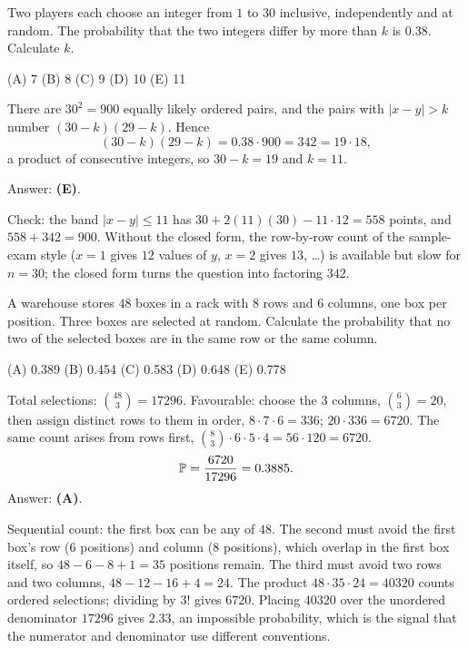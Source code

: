 \begin{example}
Two players each choose an integer from $1$ to $30$ inclusive, independently and at random.
The probability that the two integers differ by more than $k$ is $0.38$. Calculate $k$.
\par\smallskip\noindent (A) 7 \quad (B) 8 \quad (C) 9 \quad (D) 10 \quad (E) 11
\end{example}
\begin{solution}
There are $30^2 = 900$ equally likely ordered pairs, and the pairs with $|x-y|>k$ number
$(30-k)(29-k)$. Hence
\[
(30-k)(29-k) = 0.38\cdot 900 = 342 = 19\cdot 18 ,
\]
a product of consecutive integers, so $30-k = 19$ and $k = 11$.

Answer: \textbf{(E)}.

Check: the band $|x-y|\le 11$ has $30 + 2(11)(30) - 11\cdot 12 = 558$ points, and
$558 + 342 = 900$. Without the closed form, the row-by-row count of the sample-exam style
($x=1$ gives $12$ values of $y$, $x=2$ gives $13$, \dots) is available but slow for
$n=30$; the closed form turns the question into factoring $342$.
\end{solution}

\begin{example}
A warehouse stores $48$ boxes in a rack with $8$ rows and $6$ columns, one box per position.
Three boxes are selected at random. Calculate the probability that no two of the selected
boxes are in the same row or the same column.
\par\smallskip\noindent (A) 0.389 \quad (B) 0.454 \quad (C) 0.583 \quad (D) 0.648 \quad (E) 0.778
\end{example}
\begin{solution}
Total selections: $\binom{48}{3} = 17296$. Favourable: choose the $3$ columns,
$\binom{6}{3} = 20$, then assign distinct rows to them in order, $8\cdot 7\cdot 6 = 336$;
$20\cdot 336 = 6720$. The same count arises from rows first,
$\binom{8}{3}\cdot 6\cdot 5\cdot 4 = 56\cdot 120 = 6720$.
\[
\mathbb{P} = \frac{6720}{17296} = 0.3885 .
\]
Answer: \textbf{(A)}.

Sequential count: the first box can be any of $48$. The second must avoid the first box's
row ($6$ positions) and column ($8$ positions), which overlap in the first box itself, so
$48 - 6 - 8 + 1 = 35$ positions remain. The third must avoid two rows and two columns,
$48 - 12 - 16 + 4 = 24$. The product $48\cdot 35\cdot 24 = 40320$ counts ordered
selections; dividing by $3!$ gives $6720$. Placing $40320$ over the unordered denominator
$17296$ gives $2.33$, an impossible probability, which is the signal that the numerator and
denominator use different conventions.
\end{solution}

